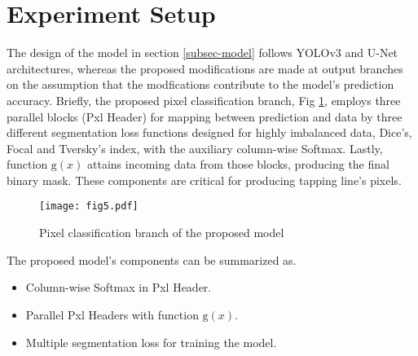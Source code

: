 \documentclass[default,pdflatex,iicol]{sn-jnl}%
\begin{document}
\section{Experiment Setup}\label{sec-exp}
The design of the model in section \ref{subsec-model} follows YOLOv3 and U-Net architectures, whereas the proposed modifications are made at output branches on the assumption that the modfications contribute to the model's prediction accuracy. Briefly, the proposed pixel classification branch, Fig \ref{fig5-proposedPxlHeader}, employs three parallel blocks (Pxl Header) for mapping between prediction and data by three different segmentation loss functions designed for highly imbalanced data, Dice's, Focal and Tversky's index, with the auxiliary column-wise Softmax. Lastly, function $\mathrm{g}(x)$ attains incoming data from those blocks, producing the final binary mask. These components are critical for producing tapping line's pixels.

\begin{figure}[h]%
\centering
\texttt{[image: fig5.pdf]}
\caption{Pixel classification branch of the proposed model}\label{fig5-proposedPxlHeader}
\end{figure}

The proposed model's components can be summarized as.
\begin{itemize}
  \item Column-wise Softmax in Pxl Header.
  \item Parallel Pxl Headers with function $\mathrm{g}(x)$.
  \item Multiple segmentation loss for training the model.
\end{itemize}
\end{document}
